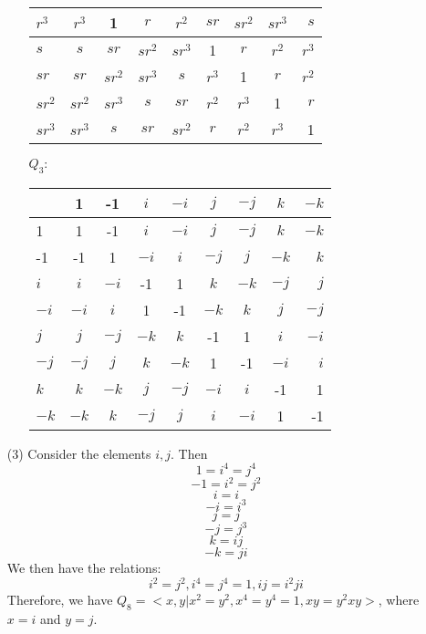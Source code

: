 \documentclass[12pt]{article}
\begin{document}
\begin{itemize}
\begin{itemize}
\begin{tabular}{| l || c | c | c | c | c | c | c | r |}
$r^3$ & $r^3$ & 1 & $r$ & $r^2$ & $sr$ & $sr^2$ & $sr^3$ & $s$ \\
\hline
$s$ & $s$ & $sr$ & $sr^2$ & $sr^3$ & 1 & $r$ & $r^2$ & $r^3$ \\
\hline
$sr$ & $sr$ & $sr^2$ & $sr^3$ & $s$ & $r^3$ & 1 & $r$ & $r^2$ \\
\hline
$sr^2$ & $sr^2$ & $sr^3$ & $s$ & $sr$ & $r^2$ & $r^3$ & 1 & $r$ \\
\hline
$sr^3$ & $sr^3$ & $s$ & $sr$ & $sr^2$ & $r$ & $r^2$ & $r^3$ & 1 \\
\hline
\end{tabular}
\item[$Q_3:$]
\begin{tabular}{| l || c | c | c | c | c | c | c | r |}
\hline
& 1 & -1 & $i$ & $-i$ & $j$ & $-j$ & $k$ & $-k$ \\
\hline
\hline
1 & 1 & -1 & $i$ & $-i$ & $j$ & $-j$ & $k$ & $-k$ \\
\hline
-1 & -1 & 1 & $-i$ & $i$ & $-j$ & $j$ & $-k$ & $k$ \\
\hline
$i$ & $i$ & $-i$ & -1 & 1 & $k$ & $-k$ & $-j$ & $j$ \\
\hline
$-i$ & $-i$ & $i$ & 1 & -1 & $-k$ & $k$ & $j$ & $-j$ \\
\hline
$j$ & $j$ & $-j$ & $-k$ & $k$ & -1 & 1 & $i$ & $-i$ \\
\hline
$-j$ & $-j$ & $j$ & $k$ & $-k$ & 1 & -1 & $-i$ & $i$ \\
\hline
$k$ & $k$ & $-k$ & $j$ & $-j$ & $-i$ & $i$ & -1 & 1 \\
\hline
$-k$ & $-k$ & $k$ & $-j$ & $j$ & $i$ & $-i$ & 1 & -1 \\
\hline
\end{tabular}
\end{itemize}
\item[(3)]
Consider the elements $i, j$. Then
$$1 = i^4 = j^4$$
$$-1 = i^2 = j^2$$
$$i = i$$
$$-i = i^3$$
$$j = j$$
$$-j = j^3$$
$$k = ij$$
$$-k = ji$$
We then have the relations:
$$i^2 = j^2, i^4 = j^4 = 1, ij = i^2ji$$
Therefore, we have
$Q_8 = <x , y | x^2 = y^2, x^4 = y^4 = 1, xy = y^2xy >$, where $x = i$ and $y = j$.

\end{itemize}
\end{document}
